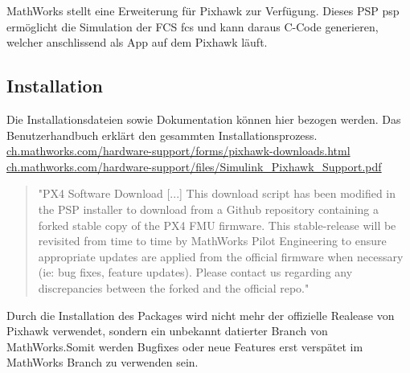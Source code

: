 MathWorks stellt eine Erweiterung für Pixhawk zur Verfügung. Dieses PSP \acrlong{psp}  ermöglicht die Simulation der FCS \acrlong{fcs} und kann daraus C-Code generieren, welcher anschlissend als App auf dem Pixhawk läuft. 

\cite{mathworks_psp}

\subsection*{Installation}
Die Installationsdateien sowie Dokumentation können hier bezogen werden. Das Benutzerhandbuch erklärt den gesammten Installationsprozess.\\
\href{ch.mathworks.com/hardware-support/forms/pixhawk-downloads.html}{ch.mathworks.com/hardware-support/forms/pixhawk-downloads.html}\\
\href{ch.mathworks.com/hardware-support/files/Simulink_Pixhawk_Support.pdf}{ch.mathworks.com/hardware-support/files/Simulink\_Pixhawk\_Support.pdf}


\begin{quote}
"PX4 Software Download [...] This download script has been modified in the PSP installer to download from a Github repository containing a forked stable copy of the PX4 FMU firmware. This stable-release will be revisited from time to time by MathWorks Pilot Engineering to ensure appropriate updates are applied from the official firmware when necessary (ie: bug fixes, feature updates). Please contact us regarding any discrepancies between the forked and the official repo."\cite{mathworks_psp}
\end{quote}
\begin{flushleft}
Durch die Installation des Packages wird nicht mehr der offizielle Realease von Pixhawk verwendet, sondern ein unbekannt datierter Branch von MathWorks.Somit werden Bugfixes oder neue Features erst verspätet im MathWorks Branch zu verwenden sein.
\end{flushleft}

